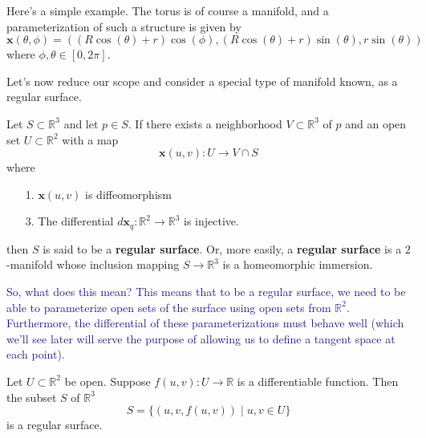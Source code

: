 \documentclass[12pt,letterpaper,boxed]{maths_v5}
\newcommand{\rr}{\mathbb{R}}
\theoremstyle{definition}
\begin{document}
\begin{example}
    Here's a simple example. The torus is of course a manifold, and a parameterization 
    of such a structure is given by 
    \[
        \bm{x}(\theta, \phi) = ((R\cos(\theta) + r)\cos(\phi), (R\cos(\theta) + r)\sin(\theta),r\sin(\theta))
    \]
    where $\phi, \theta \in [0, 2\pi]$.



\end{example}

Let's now reduce our scope and consider a special type of manifold known,
as a regular surface. 
\begin{defn}
    Let $S \subset \rr^3$ and let $p \in S$. If there exists 
    a neighborhood $V \subset \rr^3$ of $p$ and an open set $U \subset \rr^2$ 
    with a map
    \[
        \bm{x}(u, v): U \to V \cap S
    \]
    where 
    \begin{itemize}
        \item[1.] $\bm{x}(u, v)$ is diffeomorphism
        \item[3.] The differential $d\bm{x}_q:\rr^2 \to \rr^3$ is injective.
    \end{itemize}
    then $S$ is said to be a \textbf{regular surface}. Or, more easily, 
    a \textbf{regular surface} is a $2$-manifold whose inclusion mapping $S \to \rr^3$ is 
    a homeomorphic immersion.
\end{defn}
\textcolor{MidnightBlue}{So, what does this mean? This means that to be 
a regular surface, we need to be able to parameterize open sets of the 
surface using open sets from $\rr^2$. Furthermore, the differential of 
these parameterizations must behave well (which we'll see later will 
serve the purpose of allowing us to define a tangent space at each point).}



\begin{prop}
    Let $U \subset \rr^2$ be open. Suppose $f(u, v): U \to \rr$ is a
    differentiable function. Then the subset $S$ of $\rr^3$
    \[
        S = \big\{(u, v, f(u, v)) \mid u, v \in U\big\}    
    \]
    is a regular surface.
\end{prop}
\end{document}
